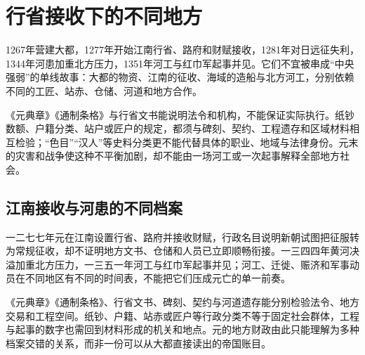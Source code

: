 \section{行省接收下的不同地方}

1267年营建大都，1277年开始江南行省、路府和财赋接收，1281年对日远征失利，1344年河患加重北方压力，1351年河工与红巾军起事并见。它们不宜被串成“中央强弱”的单线故事：大都的物资、江南的征收、海域的造船与北方河工，分别依赖不同的工匠、站赤、仓储、河道和地方合作。

《元典章》《通制条格》与行省文书能说明法令和机构，不能保证实际执行。纸钞数额、户籍分类、站户或匠户的规定，都须与碑刻、契约、工程遗存和区域材料相互检验；“色目”“汉人”等史料分类更不能代替具体的职业、地域与法律身份。元末的灾害和战争使这种不平衡加剧，却不能由一场河工或一次起事解释全部地方社会。

\subsection{江南接收与河患的不同档案}

一二七七年元在江南设置行省、路府并接收财赋，行政名目说明新朝试图把征服转为常规征收，却不证明地方文书、仓储和人员已立即顺畅衔接。一三四四年黄河决溢加重北方压力，一三五一年河工与红巾军起事并见；河工、迁徙、赈济和军事动员在不同地区有不同的时间表，不能把它们压成元亡的单一前奏。

《元典章》《通制条格》、行省文书、碑刻、契约与河道遗存能分别检验法令、地方交易和工程空间。纸钞、户籍、站赤或匠户等行政分类不等于固定社会群体，工程与起事的数字也需回到材料形成的机关和地点。元的地方财政由此只能理解为多种档案交错的关系，而非一份可以从大都直接读出的帝国账目。
